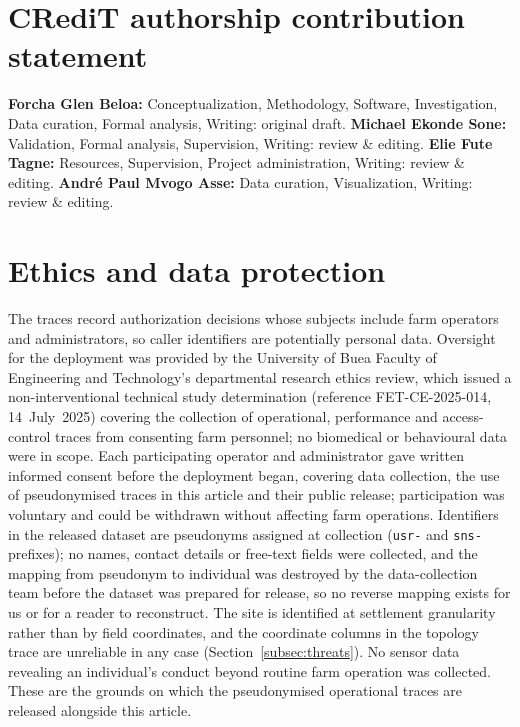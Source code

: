 \documentclass[a4paper,fleqn]{cas-sc}
\begin{document}
\section*{CRediT authorship contribution statement}

\textbf{Forcha Glen Beloa:} Conceptualization, Methodology, Software,
Investigation, Data curation, Formal analysis, Writing: original draft.
\textbf{Michael Ekonde Sone:} Validation, Formal analysis, Supervision,
Writing: review \& editing. \textbf{Elie Fute Tagne:} Resources,
Supervision, Project administration, Writing: review \& editing.
\textbf{Andr\'{e} Paul Mvogo Asse:} Data curation, Visualization,
Writing: review \& editing.

\section*{Ethics and data protection}

The traces record authorization decisions whose subjects include farm
operators and administrators, so caller identifiers are potentially personal
data. Oversight for the deployment was provided by the University of Buea
Faculty of Engineering and Technology's departmental research ethics review,
which issued a non-interventional technical study determination
(reference FET-CE-2025-014, 14~July~2025) covering the collection of
operational, performance and access-control traces from consenting farm
personnel; no biomedical or behavioural data were in scope. Each
participating operator and administrator gave written informed consent before
the deployment began,
covering data collection, the use of pseudonymised traces in this article and
their public release; participation was voluntary and could be withdrawn
without affecting farm operations. Identifiers in the released dataset are
pseudonyms assigned at collection (\texttt{usr-} and \texttt{sns-} prefixes);
no names, contact details or free-text fields were collected, and the
mapping from pseudonym to individual was destroyed by the data-collection
team before the dataset was prepared for release, so no reverse mapping
exists for us or for a reader to reconstruct. The site is identified at
settlement granularity rather than by field coordinates, and the coordinate
columns in the topology trace are unreliable in any case
(Section~\ref{subsec:threats}). No sensor data revealing an individual's
conduct beyond routine farm operation was collected. These are the grounds
on which the pseudonymised operational traces are released alongside this
article.
\end{document}
